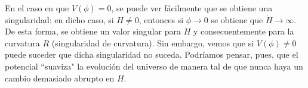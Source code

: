 En el caso en que $V(\phi)=0$, se puede ver fácilmente que se obtiene una singularidad: en dicho caso, si $H\neq0$, entonces si $\dot{\phi}\rightarrow0$ se obtiene que $\dot{H}\rightarrow\infty$. De esta forma, se obtiene un valor singular para $\dot{H}$ y consecuentemente para la curvatura $R$ (singularidad de curvatura). Sin embargo, vemos que si $V(\phi)\neq0$ puede suceder que dicha singularidad no suceda. Podríamos pensar, pues, que el potencial ``suaviza" la evolución del universo de manera tal de que nunca haya un cambio demasiado abrupto en $H$. 


